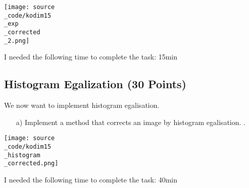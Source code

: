 \texttt{[image: source\\\_code/kodim15\\\_exp\\\_corrected\\\_2.png]}

I needed the following time to complete the task: 15min

\subsection{Histogram Egalization (30 Points)}

We now want to implement histogram egalisation. 

\begin{enumerate}
\item[a)] Implement a method that corrects an image by histogram egalisation. .
\end{enumerate}

\texttt{[image: source\\\_code/kodim15\\\_histogram\\\_corrected.png]}

I needed the following time to complete the task: 40min

